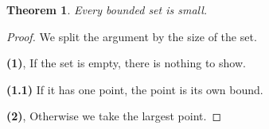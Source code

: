 \documentclass{article}
\newtheorem{theorem}{Theorem}
\begin{document}
\begin{theorem}
Every bounded set is small.
\end{theorem}
\begin{proof}
We split the argument by the size of the set.

\textbf{(1)}, If the set is empty, there is nothing to show.

{\bf (1.1)} If it has one point, the point is its own bound.

\textbf{(2)}, Otherwise we take the largest point.
\end{proof}
\end{document}
